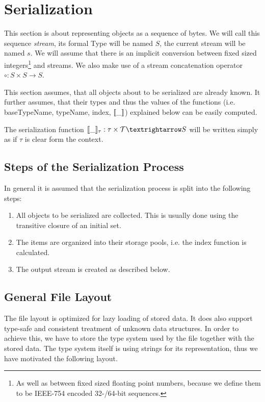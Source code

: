 \section{Serialization}
\label{serialization}

This section is about representing objects as a sequence of bytes. We will call this sequence \textit{stream}, its formal Type will be named $S$, the current stream will be named $s$. We will assume that there is an implicit conversion between fixed sized integers\footnote{As well as between fixed sized floating point numbers, because we define them to be IEEE-754 encoded 32-/64-bit sequences.} and streams. We also make use of a stream concatenation operator $\circ : S \times S → S$.

This section assumes, that all objects about to be serialized are already known. It further assumes, that their types and thus the values of the functions (i.e. baseTypeName, typeName, index, $[\![\_]\!]$) explained below can be easily computed.

The serialization function $\den{\_}_\tau : \tau \times \mathcal{T} → S$ will be written simply as \den{\_} if $\tau$ is clear form the context.


\subsection{Steps of the Serialization Process}

In general it is assumed that the serialization process is split into the following steps:
\begin{enumerate}
 \item All objects to be serialized are collected. This is usually done using the transitive closure of an initial set.
 
 \item The items are organized into their storage pools, i.e. the index function is calculated.
 
 \item The output stream is created as described below.
\end{enumerate}

\subsection{General File Layout}

The file layout is optimized for lazy loading of stored data. It does also support type-safe and consistent treatment of unknown data structures. In order to achieve this, we have to store the type system used by the file together with the stored data. The type system itself is using strings for its representation, thus we have motivated the following layout.

